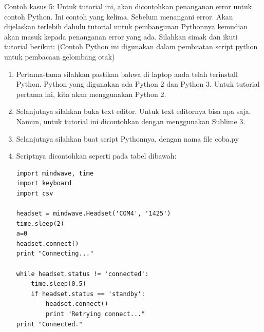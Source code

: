 Contoh kasus 5: Untuk tutorial ini, akan dicontohkan penanganan error untuk contoh Python. Ini contoh yang kelima. Sebelum menangani error. Akan dijelaskan terlebih dahulu tutorial untuk pembangunan Pythonnya kemudian akan masuk kepada penanganan error yang ada. Silahkan simak dan ikuti tutorial berikut: 
(Contoh Python ini digunakan dalam pembuatan script python untuk pembacaan gelombang otak)
\begin{enumerate}
\item Pertama-tama silahkan pastikan bahwa di laptop anda telah terinstall Python. Python yang digunakan ada Python 2 dan Python 3. Untuk tutorial pertama ini, kita akan menggunakan Python 2.
\item Selanjutnya silahkan buka text editor. Untuk text editornya bisa apa saja. Namun, untuk tutorial ini dicontohkan dengan menggunakan Sublime 3.
\item Selanjutnya silahkan buat script Pythonnya, dengan nama file coba.py
\item Scriptnya dicontohkan seperti pada tabel dibawah:
\begin{verbatim}
import mindwave, time
import keyboard
import csv

headset = mindwave.Headset('COM4', '1425')
time.sleep(2)
a=0
headset.connect()
print "Connecting..."

while headset.status != 'connected':
    time.sleep(0.5)
    if headset.status == 'standby':
        headset.connect()
        print "Retrying connect..."
print "Connected."


\end{verbatim}
\end{enumerate}
